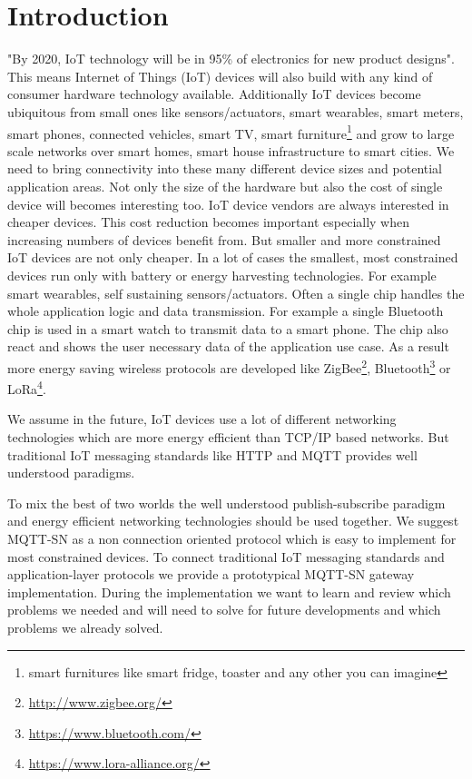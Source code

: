 \section{Introduction}\label{sec:introduction}
"By 2020, IoT technology will be in 95\% of electronics for new product designs"\cite{gartnertop10predicitions}.
This means  Internet of Things (IoT) devices will also build with any kind of consumer hardware technology available.
Additionally IoT devices become ubiquitous from small ones like sensors/actuators, smart wearables, smart meters, smart phones, connected vehicles, smart TV, smart furniture\footnote{smart furnitures like smart fridge, toaster and any other you can imagine} and grow to large scale networks over smart homes, smart house infrastructure to smart cities.
We need to bring connectivity into these many different device sizes and potential application areas.
Not only the size of the hardware but also the cost of single device will becomes interesting too.
IoT device vendors are always interested in cheaper devices.
This cost reduction becomes important especially when increasing numbers of devices benefit from.
But smaller and more constrained IoT devices are not only cheaper.
In a lot of cases the smallest, most constrained devices run only with battery or energy harvesting technologies.
For example smart wearables, self sustaining sensors/actuators.
Often a single chip handles the whole application logic and data transmission.
For example a single Bluetooth chip is used in a smart watch to transmit data to a smart phone.
The chip also react and shows the user necessary data of the application use case.
As a result more energy saving wireless protocols are developed like ZigBee\footnote{\url{http://www.zigbee.org/}}, Bluetooth\footnote{\url{https://www.bluetooth.com/}} or LoRa\footnote{\url{https://www.lora-alliance.org/}}.

We assume in the future, IoT devices use a lot of different networking technologies which are more energy efficient than TCP/IP based networks.
But traditional IoT messaging standards like HTTP and MQTT\cite{eclipseiotdevelopersurveyresults} provides well understood paradigms.

To mix the best of two worlds the well understood publish-subscribe paradigm and energy efficient networking technologies should be used together.
We suggest MQTT-SN as a non connection oriented protocol which is easy to implement for most constrained devices.
To connect traditional IoT messaging standards and application-layer protocols we provide a prototypical MQTT-SN gateway implementation. During the implementation we want to learn and review which problems we needed and will need to solve for future developments and which problems we already solved.
 
